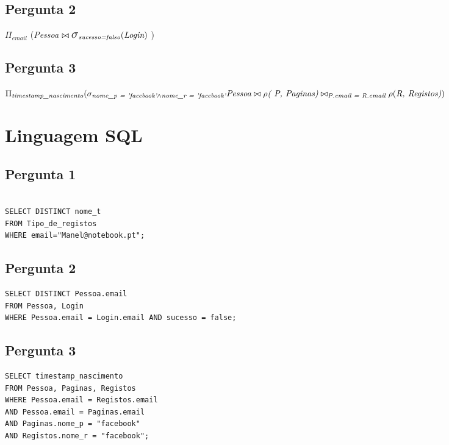 \documentclass[11pt,a4paper]{article}
\newcommand{\select}{\mbox{\Large$\sigma$}}
\begin{document}
\subsection{Pergunta 2}

$\Pi_{\textit{email}}$ (\textit{Pessoa} $ \bowtie \select_{\textit{sucesso=falso}} (\textit{Login})$ )

\subsection{Pergunta 3}

$\Pi_{\textit{timestamp\_nascimento}}(\sigma_{\textit{nome\_p = 'facebook'} \wedge \textit{nome\_r = 'facebook'}} \textit{Pessoa} \bowtie 
\\\rho\textit{( P, Paginas)} \bowtie_{\textit{P.email = R.email}} \rho( \textit{R, Registos)}) $

\section{Linguagem SQL}

\subsection{Pergunta 1}
\begin{lstlisting}

SELECT DISTINCT nome_t
FROM Tipo_de_registos
WHERE email="Manel@notebook.pt";
\end{lstlisting}

\subsection{Pergunta 2}

\begin{lstlisting}
SELECT DISTINCT Pessoa.email 
FROM Pessoa, Login 
WHERE Pessoa.email = Login.email AND sucesso = false;
\end{lstlisting}

\subsection{Pergunta 3}

\begin{lstlisting}
SELECT timestamp_nascimento
FROM Pessoa, Paginas, Registos 
WHERE Pessoa.email = Registos.email 
AND Pessoa.email = Paginas.email 
AND Paginas.nome_p = "facebook" 
AND Registos.nome_r = "facebook";
\end{lstlisting}
\end{document}
